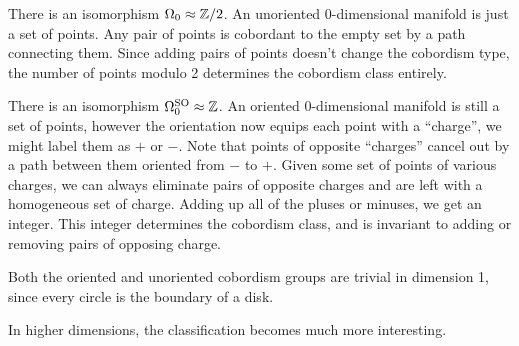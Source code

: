 \begin{example}
	There is an isomorphism $\Omega_0\approx \mathbb{Z}/2$. An unoriented 0-dimensional manifold is just a set of points. Any pair of points is cobordant to the empty set by a path connecting them. Since adding pairs of points doesn't change the cobordism type, the number of points modulo 2 determines the cobordism class entirely.
\end{example}

\begin{example}
	There is an isomorphism $\Omega_0^{\mathrm{SO}} \approx \mathbb{Z}$. An oriented 0-dimensional manifold is still a set of points, however the orientation now equips each point with a ``charge'', we might label them as $+$ or $-$. Note that points of opposite ``charges'' cancel out by a path between them oriented from $-$ to $+$. Given some set of points of various charges, we can always eliminate pairs of opposite charges and are left with a homogeneous set of charge. Adding up all of the pluses or minuses, we get an integer. This integer determines the cobordism class, and is invariant to adding or removing pairs of opposing charge.
\end{example}

\begin{example}
	Both the oriented and unoriented cobordism groups are trivial in dimension 1, since every circle is the boundary of a disk.
\end{example}

In higher dimensions, the classification becomes much more interesting.

